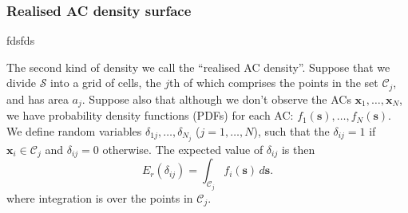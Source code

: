 \documentclass[useAMS,usenatbib,referee]{biom}
\begin{document}

\subsubsection{Realised AC density surface} \label{s:racd}
fdsfds

 
The second kind of density we call the ``realised AC density''. Suppose that we divide $\mathcal{S}$ into a grid of cells, the $j$th of which comprises the points in the set $\mathcal{C}_j$, and has area $a_j$. Suppose also that although we don't observe the ACs $\bm{x}_1,\ldots,\bm{x}_N$, we  have probability density functions (PDFs) for each AC: $f_1(\bm{s}),\ldots,f_N(\bm{s})$. We define random variables $\delta_{1j},\ldots,\delta_{N_j}$ ($j=1,\ldots,N$), such that the $\delta_{ij}=1$ if $\bm{x}_i\in\mathcal{C}_j$ and $\delta_{ij}=0$ otherwise. The expected value of $\delta_{ij}$ is then 
\begin{equation}
E_r(\delta_{ij})=\int_{\mathcal{C}_j} f_i(\bm{s}) \, d\bm{s}. \label{eq:realised-p_ij}
\end{equation}
\noindent
where integration is over the points in $\mathcal{C}_j$.
\end{document}
